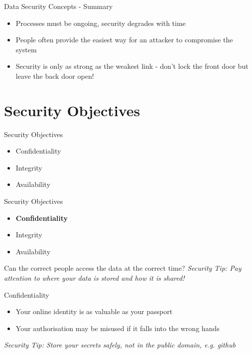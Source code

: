 \documentclass{beamer}
\begin{document}
\begin{frame}{Data Security Concepts - Summary}
\begin{itemize}
\item Processes must be ongoing, security degrades with time
\item People often provide the easiest way for an attacker to compromise the system 
\item Security is only as strong as the weakest link - don't lock the front door but leave the back door open!
\end{itemize}
\end{frame}

\section{Security Objectives}
\frame{\sectionpage}

\begin{frame}{Security Objectives}
	\begin{itemize}
		\item Confidentiality
		\item Integrity
        \item Availability
	\end{itemize}
\end{frame}


\begin{frame}{Security Objectives}
	\begin{itemize}
		\item \textbf{Confidentiality}
		\item Integrity
        \item Availability
	\end{itemize}
    Can the correct people access the data at the correct time?
	\linebreak
    \linebreak
    { \color{red} \textit{Security Tip: Pay attention to where your data is stored and how it is shared!} }
\end{frame}

\begin{frame}{Confidentiality}
\begin{itemize}
\item Your online identity is as valuable as your passport 
\item Your authorisation may be misused if it falls into the wrong hands
\end{itemize}
{ \color{red} \textit{Security Tip: Store your secrets safely, not in the public domain, e.g. github} }
\end{frame}
\end{document}

